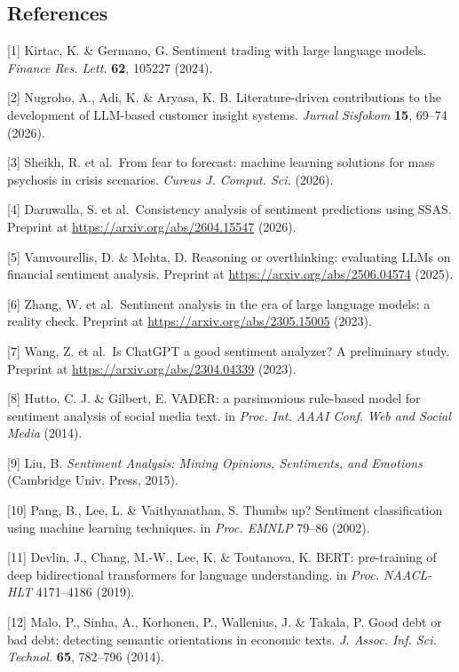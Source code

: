 \documentclass[11pt]{article}
\begin{document}
\subsection{References}\label{references}

{[}1{]} Kirtac, K. \& Germano, G. Sentiment trading with large language
models. \emph{Finance Res. Lett.} \textbf{62}, 105227 (2024).

{[}2{]} Nugroho, A., Adi, K. \& Aryasa, K. B. Literature-driven
contributions to the development of LLM-based customer insight systems.
\emph{Jurnal Sisfokom} \textbf{15}, 69--74 (2026).

{[}3{]} Sheikh, R. et al.~From fear to forecast: machine learning
solutions for mass psychosis in crisis scenarios. \emph{Cureus J.
Comput. Sci.} (2026).

{[}4{]} Daruwalla, S. et al.~Consistency analysis of sentiment
predictions using SSAS. Preprint at \url{https://arxiv.org/abs/2604.15547}
(2026).

{[}5{]} Vamvourellis, D. \& Mehta, D. Reasoning or overthinking:
evaluating LLMs on financial sentiment analysis. Preprint at
\url{https://arxiv.org/abs/2506.04574} (2025).

{[}6{]} Zhang, W. et al.~Sentiment analysis in the era of large language
models: a reality check. Preprint at \url{https://arxiv.org/abs/2305.15005}
(2023).

{[}7{]} Wang, Z. et al.~Is ChatGPT a good sentiment analyzer? A
preliminary study. Preprint at \url{https://arxiv.org/abs/2304.04339} (2023).

{[}8{]} Hutto, C. J. \& Gilbert, E. VADER: a parsimonious rule-based
model for sentiment analysis of social media text. in \emph{Proc. Int.
AAAI Conf. Web and Social Media} (2014).

{[}9{]} Liu, B. \emph{Sentiment Analysis: Mining Opinions, Sentiments,
and Emotions} (Cambridge Univ. Press, 2015).

{[}10{]} Pang, B., Lee, L. \& Vaithyanathan, S. Thumbs up? Sentiment
classification using machine learning techniques. in \emph{Proc. EMNLP}
79--86 (2002).

{[}11{]} Devlin, J., Chang, M.-W., Lee, K. \& Toutanova, K. BERT:
pre-training of deep bidirectional transformers for language
understanding. in \emph{Proc. NAACL-HLT} 4171--4186 (2019).

{[}12{]} Malo, P., Sinha, A., Korhonen, P., Wallenius, J. \& Takala, P.
Good debt or bad debt: detecting semantic orientations in economic
texts. \emph{J. Assoc. Inf. Sci. Technol.} \textbf{65}, 782--796 (2014).
\end{document}
